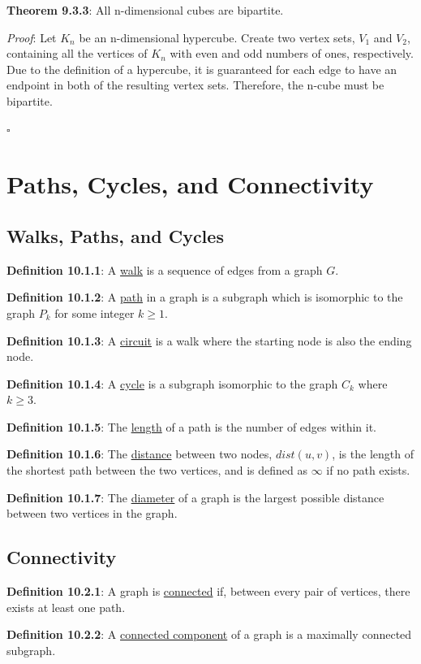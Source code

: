 \documentclass{article}
\newcommand{\separate}[1] {\vspace{#1 pt}\noindent}
\newcommand{\definition}[2]{\textbf{Definition #1}: #2\label{def:#1}}
\newcommand{\proof}[2]{\textit{Proof}: #2 \begin{flushright}\(\square\)\end{flushright}\label{prf:#1}}
\newcommand{\theorem}[3]{\textbf{Theorem #1}: #2 \par\separate{3}\proof{thm:#1}{#3}\label{thm:#1}}
\begin{document}
\separate{5}\theorem{9.3.3}{All n-dimensional cubes are bipartite.}{Let \(K_n\) be an n-dimensional hypercube. Create two vertex sets, \(V_1\) and \(V_2\), containing all the vertices of \(K_n\) with even and odd numbers of ones, respectively. Due to the definition of a hypercube, it is guaranteed for each edge to have an endpoint in both of the resulting vertex sets. Therefore, the n-cube must be bipartite.}

\section{Paths, Cycles, and Connectivity}

\subsection{Walks, Paths, and Cycles}

\definition{10.1.1}{A \underline{walk} is a sequence of edges from a graph \(G\).}

\separate{5}\definition{10.1.2}{A \underline{path} in a graph is a subgraph which is isomorphic to the graph \(P_k\) for some integer \(k \geq 1\).}

\separate{5}\definition{10.1.3}{A \underline{circuit} is a walk where the starting node is also the ending node.}

\separate{5}\definition{10.1.4}{A \underline{cycle} is a subgraph isomorphic to the graph \(C_k\) where \(k \geq 3\).}

\separate{5}\definition{10.1.5}{The \underline{length} of a path is the number of edges within it.}

\separate{5}\definition{10.1.6}{The \underline{distance} between two nodes, \(dist(u,v)\), is the length of the shortest path between the two vertices, and is defined as \(\infty\) if no path exists.}

\separate{5}\definition{10.1.7}{The \underline{diameter} of a graph is the largest possible distance between two vertices in the graph.}

\subsection{Connectivity}

\definition{10.2.1}{A graph is \underline{connected} if, between every pair of vertices, there exists at least one path.}

\separate{5}\definition{10.2.2}{A \underline{connected component} of a graph is a maximally connected subgraph.}
\end{document}
